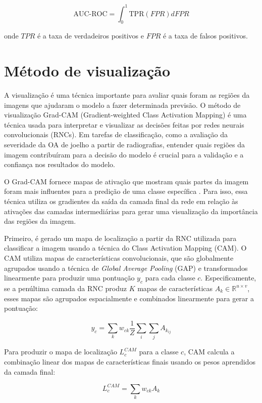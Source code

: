 \begin{equation}
    \text{AUC-ROC} = \int_{0}^{1} \text{TPR}(FPR) dFPR
\end{equation}

onde $TPR$ é a taxa de verdadeiros positivos e $FPR$ é a taxa de falsos positivos.

\section{Método de visualização}

A visualização é uma técnica importante para avaliar quais foram as regiões da imagens que ajudaram o modelo a fazer determinada previsão. O método de visualização Grad-CAM (Gradient-weighted Class Activation Mapping) é uma técnica usada para interpretar e visualizar as decisões feitas por redes neurais convolucionais (RNCs). Em tarefas de classificação, como a avaliação da severidade da OA de joelho a partir de radiografias, entender quais regiões da imagem contribuíram para a decisão do modelo é crucial para a validação e a confiança nos resultados do modelo.

O Grad-CAM fornece mapas de ativação que mostram quais partes da imagem foram mais influentes para a predição de uma classe específica \cite{Selvaraju2016}. Para isso, essa técnica utiliza os gradientes da saída da camada final da rede em relação às ativações das camadas intermediárias para gerar uma visualização da importância das regiões da imagem.

Primeiro, é gerado um mapa de localização a partir da RNC utilizada para classificar a imagem usando a técnica do Class Activation Mapping (CAM). O CAM utiliza mapas de características convolucionais, que são globalmente agrupados usando a técnica de \textit{Global Average Pooling} (GAP) e transformados linearmente para produzir uma pontuação \( y_c \) para cada classe \( c \). Especificamente, se a penúltima camada da RNC produz \( K \) mapas de características \( A_k \in \mathbb{R}^{u \times v} \), esses mapas são agrupados espacialmente e combinados linearmente para gerar a pontuação:

\[
y_c = \sum_k w_{ck} \frac{1}{Z} \sum_i \sum_j A_{k_{ij}}
\]

Para produzir o mapa de localização \( L_c^{CAM} \) para a classe \( c \), CAM calcula a combinação linear dos mapas de características finais usando os pesos aprendidos da camada final:

\[
L_c^{CAM} = \sum_k w_{ck} A_k
\]

